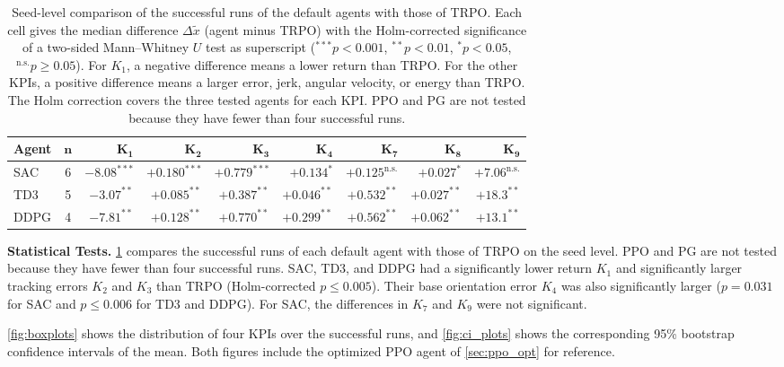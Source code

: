 \documentclass{ieeeaccess}
\begin{document}
\begin{table}[!t]
\centering
\caption{Seed-level comparison of the successful runs of the default agents with those of TRPO. Each cell
gives the median difference $\Delta\tilde{x}$ (agent minus TRPO) with the Holm-corrected significance of a
two-sided Mann--Whitney $U$ test as superscript (${}^{***}p<0.001$, ${}^{**}p<0.01$, ${}^{*}p<0.05$,
${}^{\mathrm{n.s.}}p\geq0.05$). For $K_1$, a negative difference means a lower return than TRPO. For the
other KPIs, a positive difference means a larger error, jerk, angular velocity, or energy than TRPO. The
Holm correction covers the three tested agents for each KPI. PPO and PG are not tested because they have
fewer than four successful runs.}
\label{tab:significance}
\renewcommand{\arraystretch}{1.3}
\setlength{\tabcolsep}{5pt}
\footnotesize
\begin{tabular}{lc *{7}{r}}
\toprule
\textbf{Agent} & $\boldsymbol{n}$ & $\boldsymbol{K_1}$ & $\boldsymbol{K_2}$ & $\boldsymbol{K_3}$ &
  $\boldsymbol{K_4}$ & $\boldsymbol{K_7}$ & $\boldsymbol{K_8}$ & $\boldsymbol{K_9}$ \\
\midrule
SAC  & 6 & $-8.08^{***}$ & $+0.180^{***}$ & $+0.779^{***}$ & $+0.134^{*}$ & $+0.125^{\mathrm{n.s.}}$ &
  $+0.027^{*}$ & $+7.06^{\mathrm{n.s.}}$ \\
TD3  & 5 & $-3.07^{**}$ & $+0.085^{**}$ & $+0.387^{**}$ & $+0.046^{**}$ & $+0.532^{**}$ &
  $+0.027^{**}$ & $+18.3^{**}$ \\
DDPG & 4 & $-7.81^{**}$ & $+0.128^{**}$ & $+0.770^{**}$ & $+0.299^{**}$ & $+0.562^{**}$ &
  $+0.062^{**}$ & $+13.1^{**}$ \\
\bottomrule
\end{tabular}
\end{table}

\textbf{Statistical Tests.} \cref{tab:significance} compares the successful runs of each default agent
with those of TRPO on the seed level. PPO and PG are not tested because they have fewer than four
successful runs. SAC, TD3, and DDPG had a significantly lower return $K_1$ and significantly larger
tracking errors $K_2$ and $K_3$ than TRPO (Holm-corrected $p \le 0.005$). Their base orientation error
$K_4$ was also significantly larger ($p = 0.031$ for SAC and $p \le 0.006$ for TD3 and DDPG).
For SAC, the differences in $K_7$ and $K_9$ were not significant.

\cref{fig:boxplots} shows the distribution of four KPIs over the successful runs, and
\cref{fig:ci_plots} shows the corresponding 95\% bootstrap confidence intervals of the mean. Both figures
include the optimized PPO agent of \cref{sec:ppo_opt} for reference.
\end{document}
